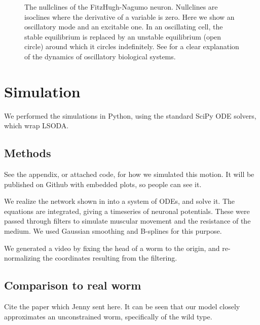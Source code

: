 \documentclass[
    11pt,
]{article}
\begin{document}
\begin{figure}[h!]
    \label{fig: fhn_dynamics}
    \centering
    \caption{The nullclines of the FitzHugh-Nagumo neuron.  Nullclines are isoclines where the derivative of a variable is zero.  Here we show an oscillatory mode and an excitable one.  In an oscillating cell, the stable equilibrium is replaced by an unstable equilibrium (open circle) around which it circles indefinitely.  See \citet{parsons2018} for a clear explanation of the dynamics of oscillatory biological systems.}
\end{figure} %



\section{Simulation}

We performed the simulations in Python, using the standard SciPy ODE solvers, which wrap LSODA. %

\subsection{Methods}

See the appendix, or attached code, for how we simulated this motion.  It will be published on Github with embedded plots, so people can see it.

We realize the network shown in  into a system of ODEs, and solve it.  The equations are integrated, giving a timeseries of neuronal potentials.  These were passed through filters to simulate muscular movement and the resistance of the medium.  We used Gaussian smoothing and B-splines for this purpose.

We generated a video by fixing the head of a worm to the origin, and re-normalizing the coordinates resulting from the filtering.

\subsection{Comparison to real worm}

Cite the paper which Jenny sent here.  It can be seen that our model closely approximates an unconstrained worm, specifically of the wild type.
\end{document}
